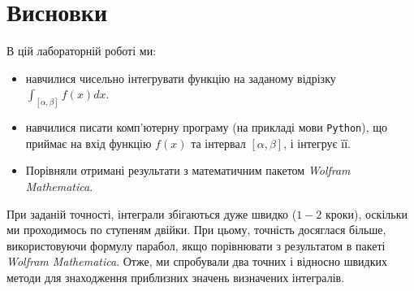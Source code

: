 \documentclass[12pt]{extarticle}
\begin{document}
\pagebreak
\section{Висновки}

В цій лабораторній роботі ми:
\begin{itemize}
\item навчилися чисельно інтегрувати функцію на заданому відрізку $\int_{[\alpha,\beta]}f(x)dx$.
\item навчилися писати комп'ютерну програму (на прикладі мови \texttt{Python}), що приймає на вхід функцію $f(x)$ та інтервал $[\alpha,\beta]$, і інтегрує її.
\item Порівняли отримані результати з математичним пакетом \textit{Wolfram Mathematica}.
\end{itemize}

При заданій точності, інтеграли збігаються дуже швидко ($1-2$ кроки), оскільки ми проходимось по ступеням двійки. При цьому, точність досяглася більше, використовуючи формулу парабол, якщо порівнювати з результатом в пакеті \textit{Wolfram Mathematica}. Отже, ми спробували два точних і відносно швидких методи для знаходження приблизних значень визначених інтегралів.
\end{document}

